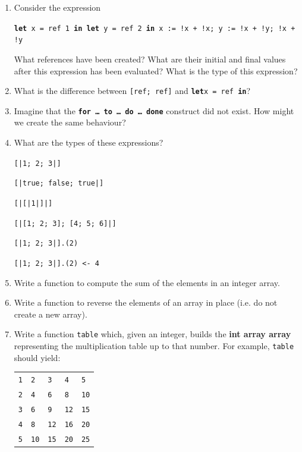 \documentclass[]{book}
\newcommand{\plet}{\textbf{let}\xspace}
\newcommand{\pin}{\textbf{in}\xspace}
\begin{document}
\begin{enumerate}
  \item Consider the expression
  
  \texttt{\textbf{let} x = ref 1 \textbf{in} \textbf{let} y = ref 2 \textbf{in} x := !x + !x; y := !x + !y; !x + !y}
  
  What references have been created? What are their initial and final values after this expression has been evaluated? What is the type of this expression? 
  \item What is the difference between \texttt{[ref;\! ref]} and \texttt{\plet \!x\! =\! ref\! \pin \![x;\! x]}? 
    
  \item Imagine that the \texttt{\textbf{for\! \!\ldots\ \!to \!\ldots\ \!do \!\ldots\ \!done}} construct did not exist. How might we create the same behaviour?
  
  \item What are the types of these expressions?
  
  \texttt{[|1; 2; 3|]}
  
  \texttt{[|true; false; true|]}
  
  \texttt{[|[|1|]|]}
  
  \texttt{[|[1; 2; 3]; [4; 5; 6]|]}
  
  \texttt{[|1; 2; 3|].(2)}
  
  \texttt{[|1; 2; 3|].(2) <- 4}
  
  \item Write a function to compute the sum of the elements in an integer array.
  
  \item Write a function to reverse the elements of an array in place (i.e. do not create a new array).
  
  \item Write a function \texttt{table} which, given an integer, builds the \textbf{\textrm{int array array}} representing the multiplication table up to that number. For example, \texttt{table} should yield:

\vspace{2mm}  
\noindent\begin{tabular}{@{}lllll@{}}
 \verb!1! & \verb!2! & \verb!3! & \verb!4! & \verb!5!\\
 \verb!2! & \verb!4! & \verb!6! & \verb!8! & \verb!10!\\
 \verb!3! & \verb!6! & \verb!9! & \verb!12! & \verb!15!\\
 \verb!4! & \verb!8! & \verb!12! & \verb!16! & \verb!20!\\
 \verb!5! & \verb!10! & \verb!15! & \verb!20! & \verb!25!
\end{tabular}
\vspace{2mm}


\end{enumerate}
\end{document}
